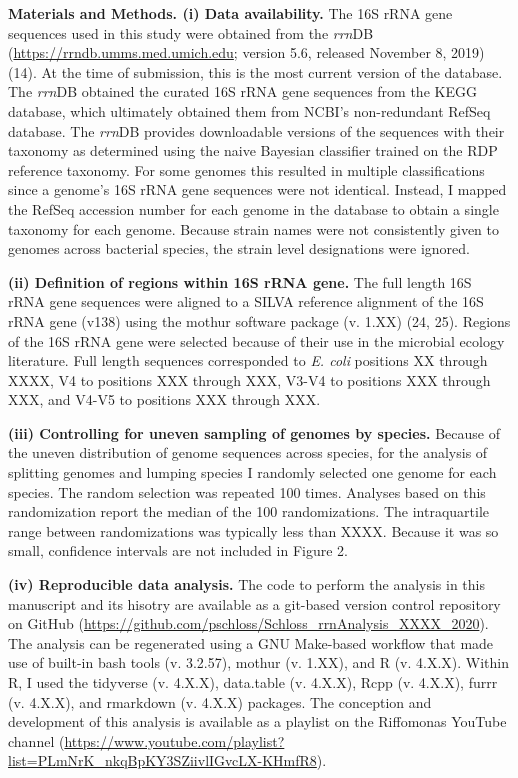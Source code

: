 \documentclass[
]{article}
\begin{document}
\textbf{Materials and Methods. (i) Data availability.} The 16S rRNA gene
sequences used in this study were obtained from the \emph{rrn}DB
(\url{https://rrndb.umms.med.umich.edu}; version 5.6, released November
8, 2019) (14). At the time of submission, this is the most current
version of the database. The \emph{rrn}DB obtained the curated 16S rRNA
gene sequences from the KEGG database, which ultimately obtained them
from NCBI's non-redundant RefSeq database. The \emph{rrn}DB provides
downloadable versions of the sequences with their taxonomy as determined
using the naive Bayesian classifier trained on the RDP reference
taxonomy. For some genomes this resulted in multiple classifications
since a genome's 16S rRNA gene sequences were not identical. Instead, I
mapped the RefSeq accession number for each genome in the database to
obtain a single taxonomy for each genome. Because strain names were not
consistently given to genomes across bacterial species, the strain level
designations were ignored.

\textbf{(ii) Definition of regions within 16S rRNA gene.} The full
length 16S rRNA gene sequences were aligned to a SILVA reference
alignment of the 16S rRNA gene (v138) using the mothur software package
(v. 1.XX) (24, 25). Regions of the 16S rRNA gene were selected because
of their use in the microbial ecology literature. Full length sequences
corresponded to \emph{E. coli} positions XX through XXXX, V4 to
positions XXX through XXX, V3-V4 to positions XXX through XXX, and V4-V5
to positions XXX through XXX.

\textbf{(iii) Controlling for uneven sampling of genomes by species.}
Because of the uneven distribution of genome sequences across species,
for the analysis of splitting genomes and lumping species I randomly
selected one genome for each species. The random selection was repeated
100 times. Analyses based on this randomization report the median of the
100 randomizations. The intraquartile range between randomizations was
typically less than XXXX. Because it was so small, confidence intervals
are not included in Figure 2.

\textbf{(iv) Reproducible data analysis.} The code to perform the
analysis in this manuscript and its hisotry are available as a git-based
version control repository on GitHub
(\url{https://github.com/pschloss/Schloss_rrnAnalysis_XXXX_2020}). The
analysis can be regenerated using a GNU Make-based workflow that made
use of built-in bash tools (v. 3.2.57), mothur (v. 1.XX), and R (v.
4.X.X). Within R, I used the tidyverse (v. 4.X.X), data.table (v.
4.X.X), Rcpp (v. 4.X.X), furrr (v. 4.X.X), and rmarkdown (v. 4.X.X)
packages. The conception and development of this analysis is available
as a playlist on the Riffomonas YouTube channel
(\url{https://www.youtube.com/playlist?list=PLmNrK_nkqBpKY3SZiivlIGvcLX-KHmfR8}).
\end{document}
